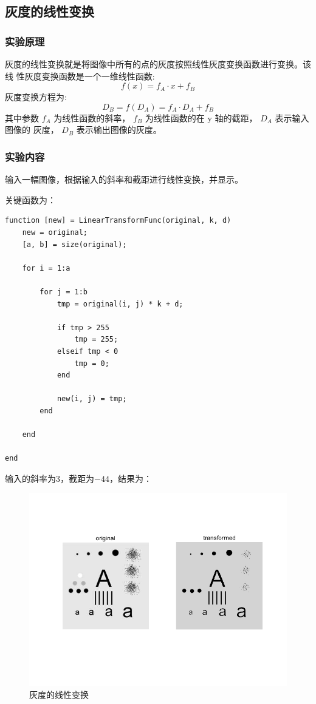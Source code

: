 \documentclass{ctexart}
\begin{document}
\subsection{\hei 灰度的线性变换}
\subsubsection{\hei 实验原理}
灰度的线性变换就是将图像中所有的点的灰度按照线性灰度变换函数进行变换。该线 性灰度变换函数是一个一维线性函数:
$$
f(x)=f_{A} \cdot x+f_{B}
$$
灰度变换方程为:
$$D_{B}=f\left(D_{A}\right)=f_{A} \cdot D_{A}+f_{B}$$
其中参数 $f_{A}$ 为线性函数的斜率， $f_{B}$ 为线性函数的在 y 轴的截距， $D_{A}$ 表示输入图像的 灰度， $D_{B}$ 表示输出图像的灰度。
\subsubsection{\hei 实验内容}
输入一幅图像，根据输入的斜率和截距进行线性变换，并显示。
\par 关键函数为：
\begin{lstlisting}[frame=single]
function [new] = LinearTransformFunc(original, k, d)
    new = original;
    [a, b] = size(original);

    for i = 1:a

        for j = 1:b
            tmp = original(i, j) * k + d;

            if tmp > 255
                tmp = 255;
            elseif tmp < 0
                tmp = 0;
            end

            new(i, j) = tmp;
        end

    end

end
\end{lstlisting}
\par 输入的斜率为$3$，截距为$-44$，结果为：
\begin{figure}[H]
    \centering
    \includegraphics[scale=0.4]{2_1.png}
    \caption{灰度的线性变换}
\end{figure}
\end{document}
